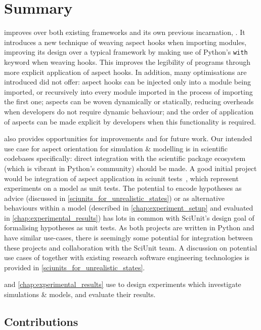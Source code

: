 \section{Summary}
\label{pdsf3_discussion}

\pdsfthree{} improves over both existing \aop{} frameworks and its own previous
incarnation, \pydysofu{}. It introduces a new technique of weaving aspect hooks
when importing modules, improving its design over a typical \aspectorientation{}
framework by making use of Python's \lstinline{with} keyword when weaving hooks.
This improves the legibility of \aspectoriented{} programs through more explicit
application of aspect hooks. In addition, many optimisations are introduced
\pydysofu did not offer: aspect hooks can be injected only into a module being
imported, or recursively into every module imported in the process of importing
the first one; aspects can be woven dynamically or statically, reducing
overheads when developers do not require dynamic behaviour; and the order of
application of aspects can be made explicit by developers when this
functionality is required.

\pdsfthree{} also provides opportunities for improvements and
for future work. Our intended use case for aspect orientation for simulation \&
modelling is in scientific codebases specifically: direct integration with the
scientific package ecosystem (which is vibrant in Python's community) should be
made. A good initial project would be integration of aspect application in
sciunit tests~\cite{sciunit_primer}, which represent experiments on a model as
unit tests. The potential to encode hypotheses as advice (discussed in
\cref{sciunits_for_unrealistic_states}) or as alternative behaviours within a
model (described in \cref{chap:experiment_setup} and evaluated in
\cref{chap:experimental_results}) has lots in common with SciUnit's design goal
of formalising hypotheses as unit tests. As both projects are written in Python
and have similar use-cases, there is seemingly some potential for integration
between these projects and collaboration with the SciUnit team. A discussion on
potential use cases of \pdsfthree together with existing research software
engineering technologies is provided in \cref{sciunits_for_unrealistic_states}.

 and \cref{chap:experimental_results} use \pdsfthree
to design experiments which investigate \aspectoriented{} simulations \& models,
and evaluate their results.

\subsection{Contributions}
\label{pdsf3_contributions_summarised}

